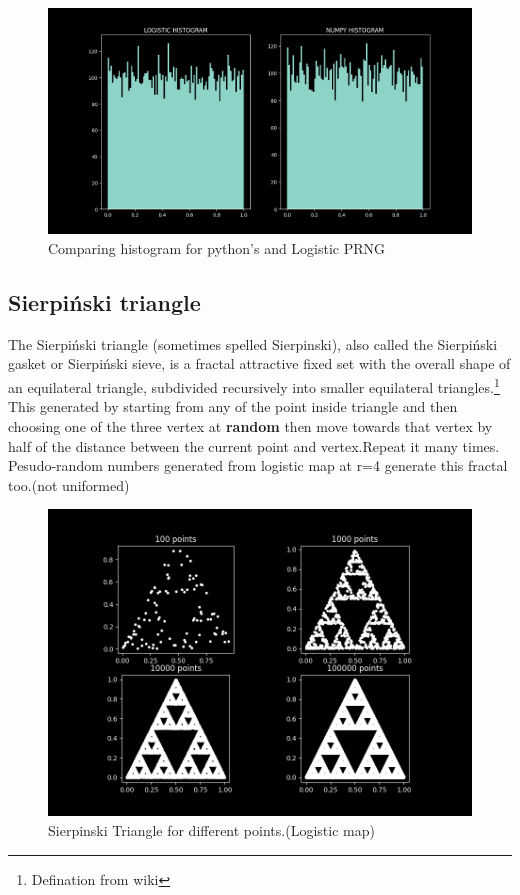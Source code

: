 \documentclass{report}
\begin{document}
\begin{figure}[!h]
    \centering
    \includegraphics[scale=.45]{images/rndHist.png}
    \caption{Comparing histogram for python's and Logistic PRNG}
    \label{fig:my_label10}
\end{figure}
\newpage

\subsection{Sierpiński triangle}
The Sierpiński triangle (sometimes spelled Sierpinski), also called the Sierpiński gasket or Sierpiński sieve, is a fractal attractive fixed set with the overall shape of an equilateral triangle, subdivided recursively into smaller equilateral triangles.\footnote[1]{Defination from wiki}
\newline
This generated by starting from any of the point inside triangle and then choosing one of the three vertex at \textbf{random} then move towards that vertex by half of the distance between the current point and vertex.Repeat it many times.
Pesudo-random numbers generated from logistic map at r=4 generate this fractal too.(not uniformed)

\begin{figure}[!h]
    \centering
    \includegraphics[scale=.4]{images/ilmtri.png}
    \caption{Sierpinski Triangle for different points.(Logistic map)}
    \label{fig:my_label11}
\end{figure}
\end{document}
